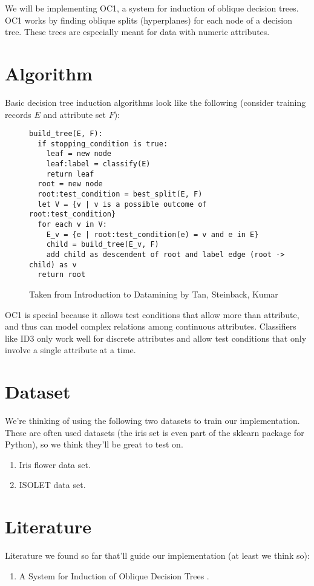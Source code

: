 \documentclass{article}
\begin{document}
We will be implementing OC1, a system for induction of oblique decision trees. OC1 works by finding oblique splits (hyperplanes) for each node of a decision tree. These trees are especially meant for data with numeric attributes.

\section*{Algorithm}
Basic decision tree induction algorithms look like the following (consider training records $E$ and attribute set $F$):
\begin{figure}[h!]
\begin{lstlisting}[frame=single]
build_tree(E, F):
  if stopping_condition is true:
    leaf = new node
    leaf:label = classify(E)
    return leaf
  root = new node
  root:test_condition = best_split(E, F)
  let V = {v | v is a possible outcome of root:test_condition}
  for each v in V:
    E_v = {e | root:test_condition(e) = v and e in E}
    child = build_tree(E_v, F)
    add child as descendent of root and label edge (root -> child) as v
  return root
\end{lstlisting}
\caption{Taken from Introduction to Datamining by Tan, Steinback, Kumar}
\end{figure}

OC1 is special because it allows test conditions that allow more than attribute, and thus can model complex relations among continuous attributes. Classifiers like ID3 only work well for discrete attributes and allow test conditions that only involve a single attribute at a time.

\section*{Dataset}
We're thinking of using the following two datasets to train our implementation. These are often used datasets (the iris set is even part of the sklearn package for Python), so we think they'll be great to test on.
\begin{enumerate}
\item Iris flower data set\cite{Bache+Lichman:2013}.
\item ISOLET data set\cite{Bache+Lichman:2013}.
\end{enumerate}

\section*{Literature}
Literature we found so far that'll guide our implementation (at least we think so):

\begin{enumerate}
\item A System for Induction of Oblique Decision Trees \cite{KSM:1994}.
\end{enumerate}



\end{document}
